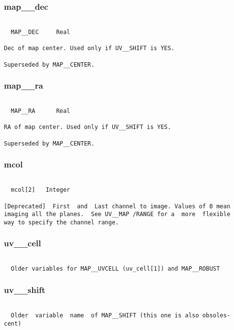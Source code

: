 \subsubsection{map\_\_dec}
\begin{verbatim}

  MAP__DEC     Real

Dec of map center. Used only if UV__SHIFT is YES.

Superseded by MAP__CENTER.

\end{verbatim}
\subsubsection{map\_\_ra}
\begin{verbatim}

  MAP__RA      Real

RA of map center. Used only if UV__SHIFT is YES.

Superseded by MAP__CENTER.

\end{verbatim}
\subsubsection{mcol}
\begin{verbatim}

  mcol[2]   Integer

[Deprecated]  First  and  Last channel to image. Values of 0 mean
imaging all the planes.  See UV__MAP /RANGE for a  more  flexible
way to specify the channel range.

\end{verbatim}
\subsubsection{uv\_\_cell}
\begin{verbatim}

  Older variables for MAP__UVCELL (uv_cell[1]) and MAP__ROBUST

\end{verbatim}
\subsubsection{uv\_\_shift}
\begin{verbatim}

  Older  variable  name  of MAP__SHIFT (this one is also obsoles-
cent)

\end{verbatim}

